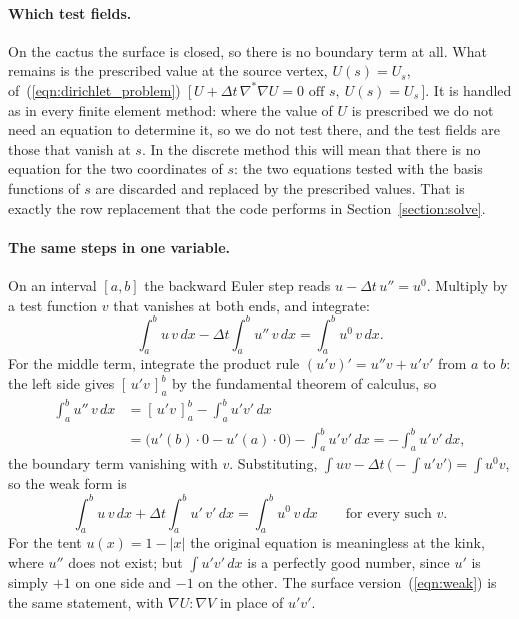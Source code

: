 \paragraph{Which test fields.} On the cactus the surface is closed, so there is no boundary term at all. What remains is the prescribed value at the source vertex, $U(s) = U_s$, of~(\ref{eqn:dirichlet_problem})~[\,$U + \Delta t\,\nabla^*\nabla U = 0 \text{ off } s,\ U(s) = U_s$\,]. It is handled as in every finite element method: where the value of $U$ is prescribed we do not need an equation to determine it, so we do not test there, and the test fields are those that vanish at $s$. In the discrete method this will mean that there is no equation for the two coordinates of $s$: the two equations tested with the basis functions of $s$ are discarded and replaced by the prescribed values. That is exactly the row replacement that the code performs in Section~\ref{section:solve}.

\paragraph{The same steps in one variable.} On an interval $[a, b]$ the backward Euler step reads $u - \Delta t\, u'' = u^0$. Multiply by a test function $v$ that vanishes at both ends, and integrate:
\begin{equation*}
\int_a^b u\, v\, dx - \Delta t \int_a^b u''\, v\, dx = \int_a^b u^0\, v\, dx .
\end{equation*}
For the middle term, integrate the product rule $(u'v)' = u''v + u'v'$ from $a$ to $b$: the left side gives $[\,u'v\,]_a^b$ by the fundamental theorem of calculus, so
\begin{align*}
\int_a^b u''\, v\, dx &= [\,u' v\,]_a^b - \int_a^b u' v'\, dx \\
&= \big( u'(b)\cdot 0 - u'(a)\cdot 0 \big) - \int_a^b u' v'\, dx = -\int_a^b u'v'\, dx ,
\end{align*}
the boundary term vanishing with $v$. Substituting, $\int u v - \Delta t\,\big(-\int u'v'\big) = \int u^0 v$, so the weak form is
\begin{equation*}
\int_a^b u\, v\, dx + \Delta t \int_a^b u'\, v'\, dx = \int_a^b u^0\, v\, dx \qquad \text{for every such } v .
\end{equation*}
For the tent $u(x) = 1 - |x|$ the original equation is meaningless at the kink, where $u''$ does not exist; but $\int u'v'\, dx$ is a perfectly good number, since $u'$ is simply $+1$ on one side and $-1$ on the other. The surface version~(\ref{eqn:weak}) is the same statement, with $\nabla U : \nabla V$ in place of $u'v'$.

